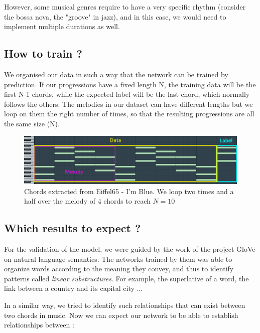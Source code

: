 \documentclass{article}
\begin{document}
\hspace{0.5cm} However, some musical genres require to have a very specific rhythm (consider the bossa nova, the "groove" in jazz), and in this case, we would need to implement multiple durations as well.

\subsection{How to train ?}
\hspace{0.5cm}We organised our data in such a way that the network can be trained by prediction. If our progressions have a fixed length N, the training data will be the first N-1 chords, while the expected label will be the last chord, which normally follows the others. The melodies in our dataset can have different lengths but we loop on them the right number of times, so that the resulting progressions are all the same size (N).

\begin{figure}[H]
\centering
\includegraphics[width =1\textwidth]{ex_n_eg_10.png}
\caption{Chords extracted from Eiffel65 - I'm Blue. We loop two times and a half over the melody of 4 chords to reach $N=10$}
\label{eiffelprog}
\end{figure}

\subsection{Which results to expect ?}\label{expectations}

\hspace{0.5cm}For the validation of the model, we were guided by the work of the project GloVe \cite{pennington2014glove} on natural language semantics. The networks trained by them was able to organize words according to the meaning they convey, and thus to identify patterns called \textit{linear substructures}. For example, the superlative of a word, the link between a country and its capital city ...

\hspace{0.5cm} In a similar way, we tried to identify such relationships that can exist between two chords in music. Now we can expect our network to be able to establish relationships between :
\end{document}

